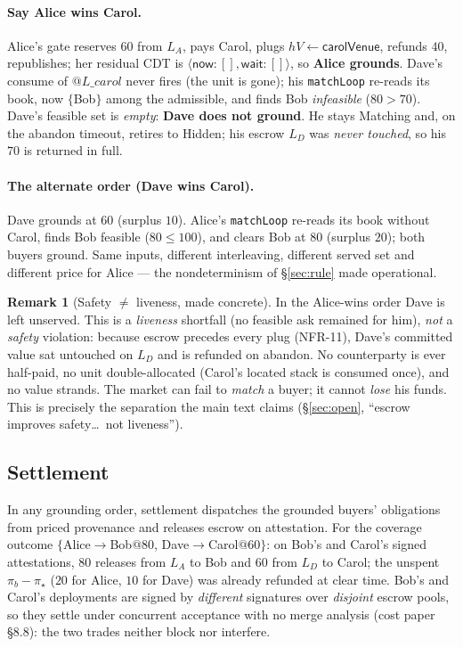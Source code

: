 \documentclass[11pt]{article}
\theoremstyle{definition}
\newtheorem{remark}{Remark}
\newcommand{\CDT}{\textsf{CDT}}
\newcommand{\now}{\textsf{now}}
\newcommand{\wait}{\textsf{wait}}
\begin{document}
\paragraph{Say Alice wins Carol.} Alice's gate reserves $60$ from $L_A$, pays Carol, plugs
$\mathit{hV}\leftarrow\textsf{carolVenue}$, refunds $40$, republishes; her residual \CDT{} is
$\langle\now:[],\wait:[]\rangle$, so \textbf{Alice grounds}. Dave's consume of $@L\_carol$ never fires
(the unit is gone); his \texttt{matchLoop} re-reads its book, now $\{$Bob$\}$ among the admissible, and
finds Bob \emph{infeasible} ($80>70$). Dave's feasible set is \emph{empty}: \textbf{Dave does not
ground}. He stays \textsf{Matching} and, on the abandon timeout, retires to \textsf{Hidden}; his
escrow $L_D$ was \emph{never touched}, so his $70$ is returned in full.

\paragraph{The alternate order (Dave wins Carol).} Dave grounds at $60$ (surplus $10$). Alice's
\texttt{matchLoop} re-reads its book without Carol, finds Bob feasible ($80\le100$), and clears Bob at
$80$ (surplus $20$); both buyers ground. Same inputs, different interleaving, different served set and
different price for Alice --- the nondeterminism of \S\ref{sec:rule} made operational.

\begin{remark}[Safety $\neq$ liveness, made concrete]
In the Alice-wins order Dave is left unserved. This is a \emph{liveness} shortfall (no feasible ask
remained for him), \emph{not} a \emph{safety} violation: because escrow precedes every plug (NFR-11),
Dave's committed value sat untouched on $L_D$ and is refunded on abandon. No counterparty is ever
half-paid, no unit double-allocated (Carol's located stack is consumed once), and no value strands.
The market can fail to \emph{match} a buyer; it cannot \emph{lose} his funds. This is precisely the
separation the main text claims (\S\ref{sec:open}, ``escrow improves safety\ldots\ not liveness'').
\end{remark}

\subsection{Settlement}
In any grounding order, settlement dispatches the grounded buyers' obligations from priced provenance
and releases escrow on attestation. For the coverage outcome $\{$Alice$\to$Bob$@80$,
Dave$\to$Carol$@60\}$: on Bob's and Carol's signed attestations, $80$ releases from $L_A$ to Bob and
$60$ from $L_D$ to Carol; the unspent $\pi_b-\pi_\star$ ($20$ for Alice, $10$ for Dave) was already
refunded at clear time. Bob's and Carol's deployments are signed by \emph{different} signatures over
\emph{disjoint} escrow pools, so they settle under concurrent acceptance with no merge analysis (cost
paper \S8.8): the two trades neither block nor interfere.
\end{document}
